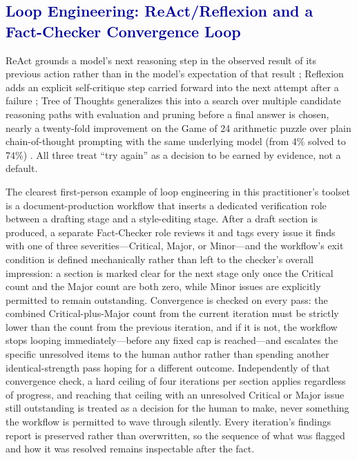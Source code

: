 \documentclass[journal]{IEEEtran}
\begin{document}
\subsection{\textcolor{darkblue}{Loop Engineering: ReAct/Reflexion and a Fact-Checker Convergence Loop}}

ReAct grounds a model's next reasoning step in the observed result of its previous action rather than in the model's expectation of that result \cite{yao2022react}; Reflexion adds an explicit self-critique step carried forward into the next attempt after a failure \cite{shinn2023reflexion}; Tree of Thoughts generalizes this into a search over multiple candidate reasoning paths with evaluation and pruning before a final answer is chosen, nearly a twenty-fold improvement on the Game of 24 arithmetic puzzle over plain chain-of-thought prompting with the same underlying model (from 4\% solved to 74\%) \cite{yao2023tree}. All three treat ``try again'' as a decision to be earned by evidence, not a default.

The clearest first-person example of loop engineering in this practitioner's toolset is a document-production workflow that inserts a dedicated verification role between a drafting stage and a style-editing stage. After a draft section is produced, a separate Fact-Checker role reviews it and tags every issue it finds with one of three severities---Critical, Major, or Minor---and the workflow's exit condition is defined mechanically rather than left to the checker's overall impression: a section is marked clear for the next stage only once the Critical count and the Major count are both zero, while Minor issues are explicitly permitted to remain outstanding. Convergence is checked on every pass: the combined Critical-plus-Major count from the current iteration must be strictly lower than the count from the previous iteration, and if it is not, the workflow stops looping immediately---before any fixed cap is reached---and escalates the specific unresolved items to the human author rather than spending another identical-strength pass hoping for a different outcome. Independently of that convergence check, a hard ceiling of four iterations per section applies regardless of progress, and reaching that ceiling with an unresolved Critical or Major issue still outstanding is treated as a decision for the human to make, never something the workflow is permitted to wave through silently. Every iteration's findings report is preserved rather than overwritten, so the sequence of what was flagged and how it was resolved remains inspectable after the fact.
\end{document}

